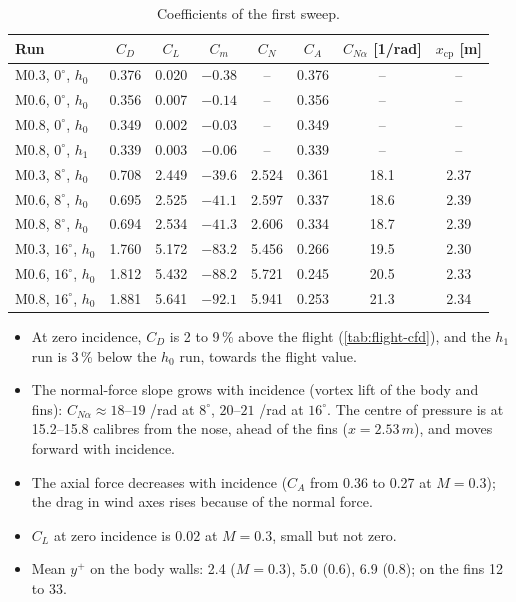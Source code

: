 \documentclass[11pt,a4paper]{article}
\newcommand{\unit}[2]{#1\,#2}
\newcommand{\yplus}{$y^+$}
\begin{document}
\begin{table}[htbp]
\centering
\caption{Coefficients of the first sweep.}\label{tab:coeffs}
\begin{tabular}{@{}lccccccc@{}}
\toprule
Run & $C_D$ & $C_L$ & $C_m$ & $C_N$ & $C_A$ & $C_{N\alpha}$ [1/rad] & $x_\text{cp}$ [m] \\
\midrule
M0.3, $0^\circ$, $h_0$ & 0.376 & 0.020 & $-0.38$ & -- & 0.376 & -- & -- \\
M0.6, $0^\circ$, $h_0$ & 0.356 & 0.007 & $-0.14$ & -- & 0.356 & -- & -- \\
M0.8, $0^\circ$, $h_0$ & 0.349 & 0.002 & $-0.03$ & -- & 0.349 & -- & -- \\
M0.8, $0^\circ$, $h_1$ & 0.339 & 0.003 & $-0.06$ & -- & 0.339 & -- & -- \\
M0.3, $8^\circ$, $h_0$ & 0.708 & 2.449 & $-39.6$ & 2.524 & 0.361 & 18.1 & 2.37 \\
M0.6, $8^\circ$, $h_0$ & 0.695 & 2.525 & $-41.1$ & 2.597 & 0.337 & 18.6 & 2.39 \\
M0.8, $8^\circ$, $h_0$ & 0.694 & 2.534 & $-41.3$ & 2.606 & 0.334 & 18.7 & 2.39 \\
M0.3, $16^\circ$, $h_0$ & 1.760 & 5.172 & $-83.2$ & 5.456 & 0.266 & 19.5 & 2.30 \\
M0.6, $16^\circ$, $h_0$ & 1.812 & 5.432 & $-88.2$ & 5.721 & 0.245 & 20.5 & 2.33 \\
M0.8, $16^\circ$, $h_0$ & 1.881 & 5.641 & $-92.1$ & 5.941 & 0.253 & 21.3 & 2.34 \\
\bottomrule
\end{tabular}
\end{table}

\begin{itemize}
\item At zero incidence, $C_D$ is 2 to 9\,\% above the flight (\cref{tab:flight-cfd}),
  and the $h_1$ run is 3\,\% below the $h_0$ run, towards the flight value.
\item The normal-force slope grows with incidence (vortex lift of the body and fins):
  $C_{N\alpha} \approx 18$--$19$ /rad at $8^\circ$, $20$--$21$ /rad at $16^\circ$. The
  centre of pressure is at 15.2--15.8 calibres from the nose, ahead of the fins
  ($x = \unit{2.53}{m}$), and moves forward with incidence.
\item The axial force decreases with incidence ($C_A$ from 0.36 to 0.27 at
  $M = 0.3$); the drag in wind axes rises because of the normal force.
\item $C_L$ at zero incidence is $0.02$ at $M = 0.3$, small but not zero.
\item Mean \yplus{} on the body walls: 2.4 ($M = 0.3$), 5.0 (0.6), 6.9 (0.8); on the
  fins 12 to 33.
\end{itemize}
\end{document}
